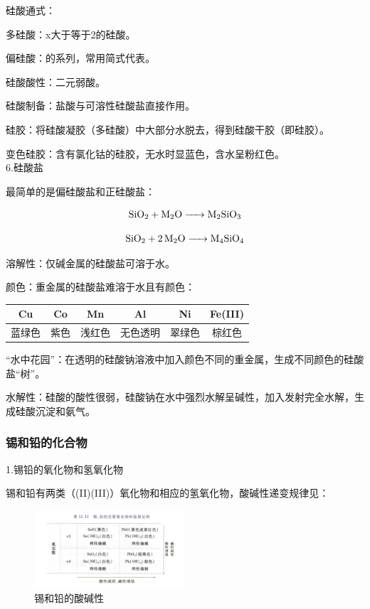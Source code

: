 \documentclass[a4paper,UTF8]{article}
\begin{document}
硅酸通式：

多硅酸：x大于等于2的硅酸。

偏硅酸：的系列，常用简式代表。

硅酸酸性：二元弱酸。

硅酸制备：盐酸与可溶性硅酸盐直接作用。

硅胶：将硅酸凝胶（多硅酸）中大部分水脱去，得到硅酸干胶（即硅胶）。

变色硅胶：含有氯化钴的硅胶，无水时显蓝色，含水呈粉红色。\\

6.硅酸盐

最简单的是偏硅酸盐和正硅酸盐：

$$ \ce{SiO2 + M2O -> M2SiO3} $$

$$ \ce{SiO2 + 2M2O -> M4SiO4} $$

溶解性：仅碱金属的硅酸盐可溶于水。

颜色：重金属的硅酸盐难溶于水且有颜色：

\begin{tabular}{c|c|c|c|c|c}

	Cu&Co&Mn&Al&Ni&Fe(III)\\ \hline
	蓝绿色&紫色&浅红色&无色透明&翠绿色&棕红色\\

\end{tabular}

“水中花园”：在透明的硅酸钠溶液中加入颜色不同的重金属，生成不同颜色的硅酸盐“树”。

水解性：硅酸的酸性很弱，硅酸钠在水中强烈水解呈碱性，加入发射完全水解，生成硅酸沉淀和氨气。

\subsubsection{锡和铅的化合物}

1.锡铅的氧化物和氢氧化物

锡和铅有两类（(II)(III)）氧化物和相应的氢氧化物，酸碱性递变规律见：

\begin{figure}[htpb]
	\centering
	\includegraphics[width=0.5\textwidth]{figure//锡和铅的酸碱性.png}
	\caption{锡和铅的酸碱性}
	\label{fig:}
\end{figure}
\end{document}
